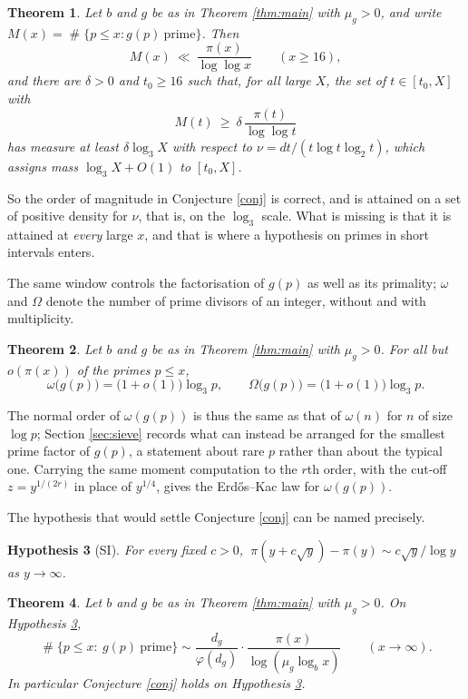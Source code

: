 \documentclass[11pt,reqno]{amsart}
\theoremstyle{plain}
\newtheorem{theorem}{Theorem}[section]
\newtheorem{hypothesis}[theorem]{Hypothesis}
\theoremstyle{definition}
\DeclareMathOperator{\Card}{\#}
\begin{document}
\begin{theorem}\label{thm:bracket}
Let $b$ and $g$ be as in Theorem \ref{thm:main} with $\mu_g>0$, and write $M(x)=\Card\{p\le x: g(p)\ \text{prime}\}$. Then
\[
M(x)\ \ll\ \frac{\pi(x)}{\log\log x}\qquad(x\ge16),
\]
and there are $\delta>0$ and $t_0\ge16$ such that, for all large $X$, the set of $t\in[t_0,X]$ with
\[
M(t)\ \ge\ \delta\,\frac{\pi(t)}{\log\log t}
\]
has measure at least $\delta\log_3X$ with respect to $\nu=dt/(t\log t\log_2t)$, which assigns mass $\log_3X+O(1)$ to $[t_0,X]$.
\end{theorem}

So the order of magnitude in Conjecture \ref{conj} is correct, and is attained on a set of positive density for $\nu$, that is, on the $\log_3$ scale. What is missing is that it is attained at \emph{every} large $x$, and that is where a hypothesis on primes in short intervals enters.

The same window controls the factorisation of $g(p)$ as well as its primality; $\omega$ and $\Omega$ denote the number of prime divisors of an integer, without and with multiplicity.

\begin{theorem}\label{thm:omega}
Let $b$ and $g$ be as in Theorem \ref{thm:main} with $\mu_g>0$. For all but $o(\pi(x))$ of the primes $p\le x$,
\[
\omega\big(g(p)\big)=\big(1+o(1)\big)\log_3p,\qquad \Omega\big(g(p)\big)=\big(1+o(1)\big)\log_3p .
\]
\end{theorem}

The normal order of $\omega(g(p))$ is thus the same as that of $\omega(n)$ for $n$ of size $\log p$; Section \ref{sec:sieve} records what can instead be arranged for the smallest prime factor of $g(p)$, a statement about rare $p$ rather than about the typical one. Carrying the same moment computation to the $r$th order, with the cut-off $z=y^{1/(2r)}$ in place of $y^{1/4}$, gives the Erd\H{o}s--Kac law for $\omega(g(p))$.

The hypothesis that would settle Conjecture \ref{conj} can be named precisely.

\begin{hypothesis}[SI]\label{hyp:si}
For every fixed $c>0$, $\ \pi(y+c\sqrt y)-\pi(y)\sim c\sqrt y/\log y$ as $y\to\infty$.
\end{hypothesis}

\begin{theorem}\label{thm:cond}
Let $b$ and $g$ be as in Theorem \ref{thm:main} with $\mu_g>0$. On Hypothesis \ref{hyp:si},
\[
\Card\{p\le x:\ g(p)\ \text{prime}\}\sim\frac{d_g}{\varphi(d_g)}\cdot\frac{\pi(x)}{\log(\mu_g\log_bx)}\qquad(x\to\infty).
\]
In particular Conjecture \ref{conj} holds on Hypothesis \ref{hyp:si}.
\end{theorem}
\end{document}
